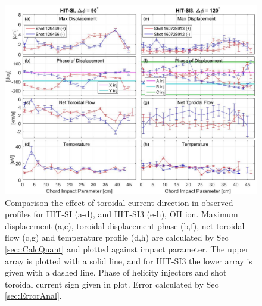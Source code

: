 	\begin{figure}
		\hspace*{-10ex}\includegraphics[width=7in]{O_II_Compare_1}\caption{Comparison the effect of toroidal current direction in observed profiles for HIT-SI (a-d), and HIT-SI3 (e-h), OII ion. Maximum displacement (a,e), toroidal displacement phase (b,f), net toroidal flow (c,g) and temperature profile (d,h) are calculated by Sec \ref{sec::CalcQuant} and plotted against impact parameter. The upper array is plotted with a solid line, and for HIT-SI3 the lower array is given with a dashed line. Phase of helicity injectors and shot toroidal current sign given in plot. Error calculated by Sec \ref{sec:ErrorAnal}.}\label{Fig::PosNeg_HIT_SI}
	\end{figure}
	
	

